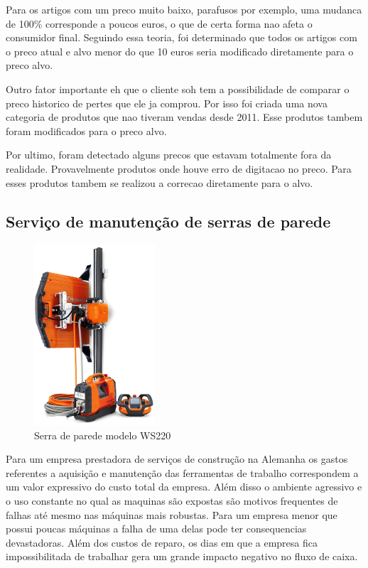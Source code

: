 \documentclass[12pt]{article}
\begin{document}
	Para os artigos com um preco muito baixo, parafusos por exemplo, uma mudanca de 100\% corresponde a poucos euros, o que de certa forma nao afeta o consumidor final. Seguindo essa teoria, foi determinado que todos os artigos com o preco atual e alvo menor do que 10 euros seria modificado diretamente para o preco alvo.

Outro fator importante eh que o cliente soh tem a possibilidade de comparar o preco historico de pertes que ele ja comprou. Por isso foi criada uma nova categoria de produtos que nao tiveram vendas desde 2011. Esse produtos tambem foram modificados para o preco alvo.

Por ultimo, foram detectado alguns precos que estavam totalmente fora da realidade. Provavelmente produtos onde houve erro de digitacao no preco. Para esses produtos tambem se realizou a correcao diretamente para o alvo.

\subsection{Serviço de manutenção de serras de parede}

\begin{figure}[h!]
	\centering
	\includegraphics[width=0.4\textwidth]{img/ws220_produto.png}
	\caption{Serra de parede modelo WS220}
	\label{fig:ws220_produto}
\end{figure}

	Para um empresa prestadora de serviços de construção na Alemanha os gastos referentes a aquisição e manutenção das ferramentas de trabalho correspondem a um valor expressivo do custo total da empresa. Além disso o ambiente agressivo e o uso constante no qual as maquinas são expostas são motivos frequentes de falhas até mesmo nas máquinas mais robustas. Para um empresa menor que possui poucas máquinas a falha de uma delas pode ter consequencias devastadoras. Além dos custos de reparo, os dias em que a empresa fica impossibilitada de trabalhar gera um grande impacto negativo no fluxo de caixa.
\end{document}
